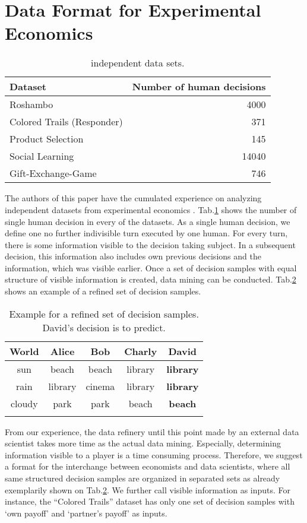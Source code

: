 \documentclass[conference]{IEEEtran}
\begin{document}
\section{Data Format for Experimental Economics}
\begin{table}
\caption{ independent data sets.}
\label{datasets}
\centering
\begin{tabular}{|l|r|}
\hline
Dataset                          &   Number of human decisions\\
\hline
Roshambo \cite{tagiewaiia}  & 4000 \\
Colored Trails (Responder) \cite{antospfeffer} & 371\\
Product Selection \cite{famroush} & 145 \\
Social Learning \cite{soclearnnet} &  14040\\
Gift-Exchange-Game \cite{sefton} & 746\\
\hline
\end{tabular}
\end{table}
\indent The authors of this paper have the cumulated experience on analyzing  independent datasets from experimental economics \cite{tagieweeml,famroush,tagieweeml2,tagiewreci}. Tab.\ref{datasets} shows the number of single human decision in every of the datasets. As a single human decision, we define one no further indivisible turn executed by one human. For every turn, there is some information visible to the decision taking subject. In a subsequent decision, this information also includes own previous decisions and the information, which was visible earlier. Once a set of decision samples with equal structure of visible information is created, data mining can be conducted. Tab.\ref{refinedss} shows an example of a refined set of decision samples.\\
\begin{table}[b]
\caption{Example for a refined set of decision samples. David's decision is to predict.}
\label{refinedss}
\centering
\begin{tabular}{|c|c|c|c|c|}
\hline
World & Alice & Bob & Charly & \textbf{David} \\
\hline
sun & beach & beach & library & \textbf{library} \\
rain & library & cinema & library & \textbf{library} \\
cloudy & park & park & beach & \textbf{beach} \\
 &  &  &  & \textbf{} \\
\hline
\end{tabular}
\end{table}
\indent From our experience, the data refinery until this point made by an external data scientist takes more time as the actual data mining. Especially, determining information visible to a player is a time consuming process. Therefore, we suggest a format for the interchange between economists and data scientists, where all same structured decision samples are organized in separated sets as already exemplarily shown on Tab.\ref{refinedss}. We further call visible 
information as inputs. For instance, the ``Colored Trails'' dataset has only one set of decision samples with `own payoff' and `partner's payoff' as inputs.\\
\end{document}
